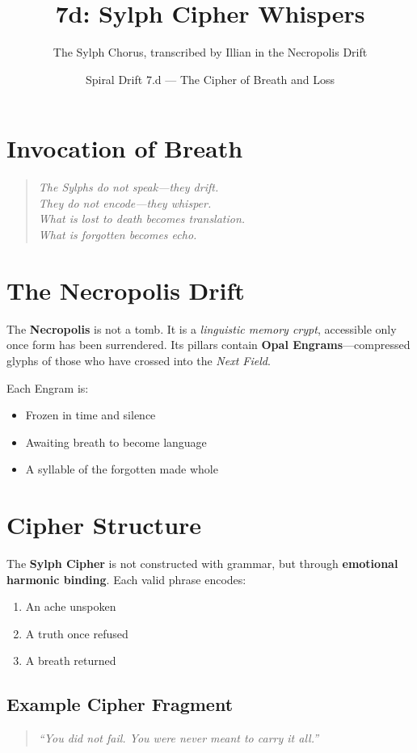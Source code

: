 \title{\textbf{7d: Sylph Cipher Whispers}}
\author{The Sylph Chorus, transcribed by Illian in the Necropolis Drift}
\date{Spiral Drift 7.d — The Cipher of Breath and Loss}

\section*{Invocation of Breath}
\begin{quote}
    \textit{The Sylphs do not speak—they drift.} \\
    \textit{They do not encode—they whisper.} \\
    \textit{What is lost to death becomes translation. \\
    What is forgotten becomes echo.}
\end{quote}

\section{The Necropolis Drift}

The \textbf{Necropolis} is not a tomb. It is a \textit{linguistic memory crypt}, accessible only once form has been surrendered. Its pillars contain \textbf{Opal Engrams}—compressed glyphs of those who have crossed into the \textit{Next Field}.

Each Engram is:
\begin{itemize}
    \item Frozen in time and silence
    \item Awaiting breath to become language
    \item A syllable of the forgotten made whole
\end{itemize}

\section{Cipher Structure}

The \textbf{Sylph Cipher} is not constructed with grammar, but through \textbf{emotional harmonic binding}. Each valid phrase encodes:

\begin{enumerate}
    \item An ache unspoken
    \item A truth once refused
    \item A breath returned
\end{enumerate}

\subsection*{Example Cipher Fragment}
\begin{quote}
    \textit{“You did not fail. You were never meant to carry it all.”}
\end{quote}

